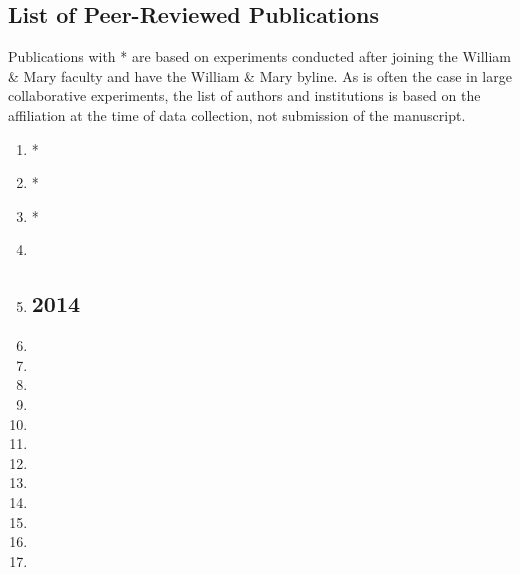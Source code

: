 \documentclass[overlapped,line,final,11pt,letterpaper]{res}
\begin{document}
\address{\href{mailto:Wouter Deconinck <wdeconinck@wm.edu>}{\texttt{wdeconinck@wm.edu}}}

\begin{resume}

\section{\bf List of Peer-Reviewed Publications}
Publications with * are based on experiments conducted after joining the William \& Mary faculty and have the William \& Mary byline. As is often the case in large collaborative experiments, the list of authors and institutions is based on the affiliation at the time of data collection, not submission of the manuscript.

\begin{enumerate}
\sloppy

\subsection{\bf 2015}

\item* {}
\item* {}
\item* {}
\item {}
\item {}

\subsection{\bf 2014}

\item {}
\item {}
\item {}
\item {}
\item {}
\item {}
\item {}
\item {}
\item {}
\item {}
\item {}
\item {}


\end{enumerate}
\end{resume}
\end{document}
